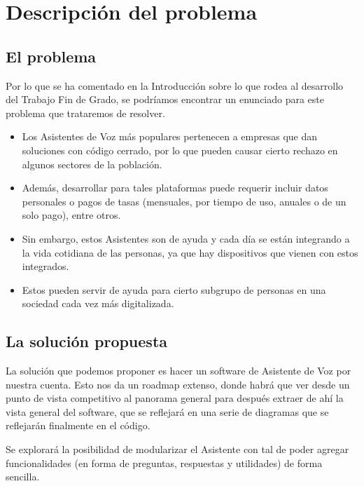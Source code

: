 \chapter{Descripción del problema}

\noindent{}
\newline

\section{El problema}
Por lo que se ha comentado en la Introducción sobre lo que rodea al desarrollo del Trabajo Fin de Grado, se podríamos encontrar un enunciado para este problema que trataremos de resolver.

\begin{itemize}
	\item Los Asistentes de Voz más populares pertenecen a empresas que dan soluciones con código cerrado, por lo que pueden causar cierto rechazo en algunos sectores de la población. 
	\item Además, desarrollar para tales plataformas puede requerir incluir datos personales o pagos de tasas (mensuales, por tiempo de uso, anuales o de un solo pago), entre otros.
	\item Sin embargo, estos Asistentes son de ayuda y cada día se están integrando a la vida cotidiana de las personas, ya que hay dispositivos que vienen con estos integrados.
	\item Estos pueden servir de ayuda para cierto subgrupo de personas en una sociedad cada vez más digitalizada.
\end{itemize}

\section{La solución propuesta}
La solución que podemos proponer es hacer un software de Asistente de Voz por nuestra cuenta. Esto nos da un roadmap extenso, donde habrá que ver desde un punto de vista competitivo al panorama general para después extraer de ahí la vista general del software, que se reflejará en una serie de diagramas que se reflejarán finalmente en el código.

Se explorará la posibilidad de modularizar el Asistente con tal de poder agregar funcionalidades (en forma de preguntas, respuestas y utilidades) de forma sencilla.

